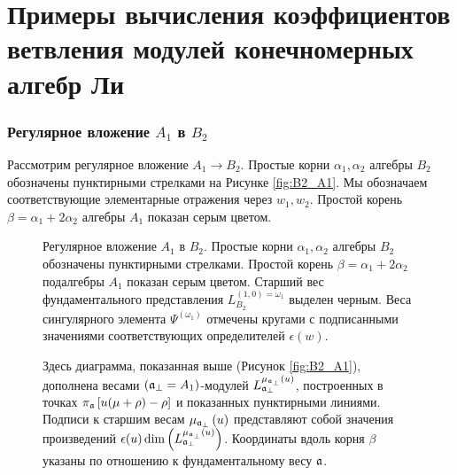 \section{Примеры вычисления коэффициентов ветвления модулей конечномерных алгебр Ли}
\label{sec:finite-dimens-lie}

\subsubsection{Регулярное вложение $A_1$ в $B_2$}
\label{sec:regul-embedd-a_1}

Рассмотрим регулярное вложение $A_1\to B_2$. Простые корни $\alpha_1, \alpha_2$ алгебры $B_2$ обозначены пунктирными стрелками на Рисунке \ref{fig:B2_A1}. Мы обозначаем соответствующие элементарные отражения через $w_1, w_2$. Простой корень $\beta = \alpha_1+2\alpha_2$ алгебры $A_1$ показан серым цветом.


\begin{figure}[p]
  \noindent{}
  \caption{Регулярное вложение  $A_1$ в $B_2$. Простые корни  $\alpha_1, \alpha_2$ алгебры $B_2$ обозначены пунктирными стрелками. Простой корень $\beta = \alpha_1+2\alpha_2$ подалгебры $A_1$ показан серым цветом. Старший вес фундаментального представления $L^{(1,0)=\omega_1}_{B_2}$ выделен черным. Веса сингулярного элемента $\Psi^{(\omega_1)}$ отмечены кругами с подписанными значениями соответствующих определителей $\epsilon(w)$.}
  \label{fig:B2_A1}

  \noindent{}
  \caption{Здесь диаграмма, показанная выше (Рисунок \ref{fig:B2_A1}), дополнена весами $\left( \mathfrak{a}_{\perp}=A_1 \right)$-модулей $L_{\mathfrak{a}_{\perp }}^{\mu_{\mathfrak{a}_{\perp }}\left( u\right) }$, построенных в точках $\pi _{\mathfrak{a}}\left[ u(\mu +\rho )-\rho \right] $ и показанных пунктирными линиями. 
    Подписи к старшим весам   $\mu_{\mathfrak{a}_{\perp }}\left( u\right)$ представляют собой значения произведений $\epsilon(u)\dim\left(L_{\mathfrak{a}_{\perp}}^{\mu_{\mathfrak{a}_{\perp }}\left( u\right) }\right)$.
    Координаты вдоль корня $\beta$ указаны по отношению к фундаментальному весу $\mathfrak{a}$. }
\label{fig:B2_A1_2}
\end{figure}

